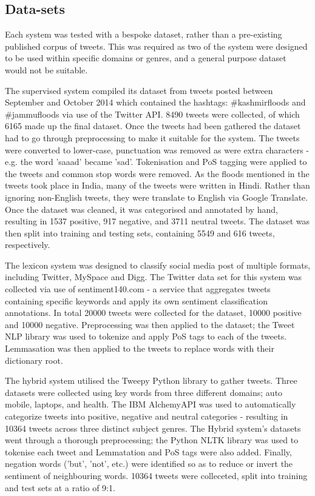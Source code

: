 \documentclass[twocolumn]{article}
\begin{document}
\subsection{Data-sets}
Each system was tested with a bespoke dataset, rather than a pre-existing
published  corpus of tweets.  
This was required as two of the system were designed to be used within
specific domains or genres, and a general purpose dataset would not be
suitable.

The supervised system compiled its dataset from tweets posted between September
and October 2014 which contained the hashtags: \#kashmirfloods and \#jammufloods
via use of the Twitter API.
8490 tweets were collected, of which 6165 made up the final dataset.
Once the tweets had been gathered the dataset had to go through preprocessing
to make it suitable for the system.
The tweets were converted to lower-case, punctuation was removed as were extra
characters - e.g. the word 'saaad' became 'sad'.  
Tokenisation and PoS tagging were applied to the tweets and common stop words
were removed. 
As the floods mentioned in the tweets took place in India, many of the tweets
were written in Hindi.
Rather than ignoring non-English tweets, they were translate to English via
Google Translate.  
Once the dataset was cleaned, it was categorised and annotated by hand,
resulting in 1537 positive, 917 negative, and 3711 neutral tweets.
The dataset was then split into training and testing sets, containing 5549 and
616 tweets, respectively.

The lexicon system was designed to classify social media post of multiple
formats, including Twitter, MySpace and Digg.
The Twitter data set for this system was collected via use of sentiment140.com
- a service that aggregates tweets containing specific keywords and apply its
own sentiment classification annotations.
In total 20000 tweets were collected for the dataset, 10000 positive and 10000
negative.
Preprocessing was then applied to the dataset; the Tweet NLP library was used
to tokenize and apply PoS tags to each of the tweets.
Lemmasation was then applied to the tweets to replace words with their
dictionary root.

The hybrid system utilised the Tweepy Python library to gather tweets.
Three datasets were collected using key words from three different domains; 
auto mobile, laptops, and health.
The IBM  AlchemyAPI was used to automatically categorize tweets into
positive, negative and neutral categories - resulting in 10364 tweets across
three distinct subject genres.
The Hybrid system's datasets went through a thorough preprocessing;
the Python NLTK library was used to tokenise each tweet and Lemmatation and
PoS tags were also added.  
Finally, negation words ('but', 'not', etc.) were identified so as to reduce
or invert the sentiment of neighbouring words.
10364 tweets were colleceted, split into training and test sets at a ratio of
9:1.
\end{document}
